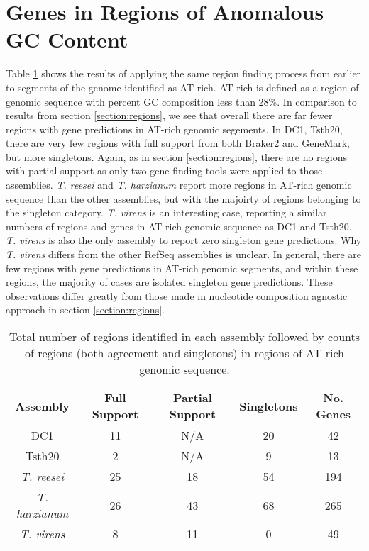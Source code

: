\section{Genes in Regions of Anomalous GC Content}
\label{section:gc-regions}

Table \ref{table:gc-regions} shows the results of applying the same
region finding process from earlier to segments of the genome
identified as AT-rich. AT-rich is defined as a region of genomic
sequence with percent GC composition less than 28\%. In comparison to
results from section \ref{section:regions}, we see that overall there
are far fewer regions with gene predictions in AT-rich genomic
segements. In DC1, Tsth20, there are very few regions with full
support from both Braker2 and GeneMark, but more singletons. Again, as
in section \ref{section:regions}, there are no regions with partial
support as only two gene finding tools were applied to those
assemblies. \textit{T. reesei} and \textit{T. harzianum} report more
regions in AT-rich genomic sequence than the other assemblies, but
with the majoirty of regions belonging to the singleton
category. \textit{T. virens} is an interesting case, reporting a
similar numbers of regions and genes in AT-rich genomic sequence as
DC1 and Tsth20. \textit{T. virens} is also the only assembly to report
zero singleton gene predictions. Why \textit{T. virens} differs from the
other RefSeq assemblies is unclear. In general, there are few regions
with gene predictions in AT-rich genomic segments, and within these
regions, the majority of cases are isolated singleton gene
predictions. These observations differ greatly from those made in
nucleotide composition agnostic approach in section
\ref{section:regions}.

\begin{table}
  \begin{center}
    \begin{tabular}{|c|c|c|c|c|}
      \hline
      Assembly & Full Support & Partial Support & Singletons & No. Genes \\ \hline
      DC1 & 11 & N/A & 20 & 42  \\ \hline
      Tsth20 & 2 & N/A & 9 & 13  \\ \hline
      \textit{T. reesei} & 25 & 18 & 54 & 194  \\ \hline
      \textit{T. harzianum} & 26 & 43 & 68 & 265  \\ \hline
      \textit{T. virens} & 8 & 11 & 0 & 49  \\ \hline
    \end{tabular}
  \end{center}
  \caption[Agreement of predictions in anomalous GC regions.]{Total
    number of regions identified in each assembly followed by counts
    of regions (both agreement and singletons) in regions of AT-rich
    genomic sequence.}
  \label{table:gc-regions}
\end{table}

